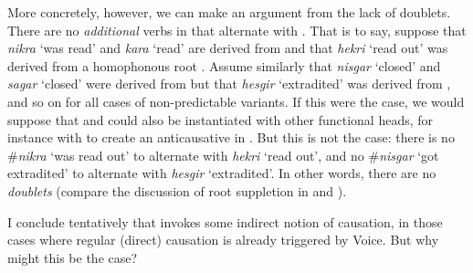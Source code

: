 \begin{exe}
\begin{xlist}
\begin{xlist}
\begin{exe}
\begin{exe}
\begin{xlist}
\begin{exe}
\begin{xlist}
\begin{exe}
\begin{xlist}
\begin{xlist}
\begin{exe}
\begin{xlist}
\begin{exe}
\begin{xlist}
\begin{exe}
\begin{exe}
\begin{exe}
\begin{xlist}
\begin{exe}
\begin{exe}
\begin{xlist}
\begin{xlist}
\begin{exe}
\begin{xlist}
\begin{exe}
\begin{exe}
\begin{exe}
\begin{xlist}
\begin{exe}
\begin{exe}
\begin{xlist}
\begin{exe}
\begin{xlist}
\begin{exe}
\begin{xlist}
\begin{exe}
\begin{xlist}
\begin{exe}
\begin{exe}
\begin{xlist}
\begin{exe}
\begin{exe}
\begin{xlist}
\begin{xlist}
\begin{exe}
\begin{xlist}
\begin{xlist}
\begin{exe}
\begin{xlist}
\begin{exe}
\begin{xlist}
More concretely, however, we can make an argument from the lack of doublets. There are no \emph{additional} verbs in {\tnif} that alternate with {\thif}. That is to say, suppose that \emph{nikra} `was read' and \emph{kara} `read' are derived from  and that \emph{hekri} `read out' was derived from a homophonous root . Assume similarly that \emph{nisgar} `closed' and \emph{sagar} `closed' were derived from  but that \emph{hesgir} `extradited' was derived from , and so on for all cases of non-predictable  variants. If this were the case, we would suppose that  and  could also be instantiated with other functional heads, for instance with {\vz} to create an anticausative in {\tnif}. But this is not the case: there is no \#\emph{nikra} `was read out' to alternate with \emph{hekri} `read out', and no \#\emph{nisgar} `got extradited' to alternate with \emph{hesgir} `extradited'. In other words, there are no \emph{doublets} (compare the discussion of root suppletion in \citealt{harley14thlia,harley14thlib,harley15roots} and \citealt{borer14thli}).

I conclude tentatively that {\vd} invokes some indirect notion of causation, in those cases where regular (direct) causation is already triggered by Voice. But why might this be the case?



\end{xlist}
\end{exe}
\end{xlist}
\end{exe}
\end{xlist}
\end{xlist}
\end{exe}
\end{xlist}
\end{xlist}
\end{exe}
\end{exe}
\end{xlist}
\end{exe}
\end{exe}
\end{xlist}
\end{exe}
\end{xlist}
\end{exe}
\end{xlist}
\end{exe}
\end{xlist}
\end{exe}
\end{exe}
\end{xlist}
\end{exe}
\end{exe}
\end{exe}
\end{xlist}
\end{exe}
\end{xlist}
\end{xlist}
\end{exe}
\end{exe}
\end{xlist}
\end{exe}
\end{exe}
\end{exe}
\end{xlist}
\end{exe}
\end{xlist}
\end{exe}
\end{xlist}
\end{xlist}
\end{exe}
\end{xlist}
\end{exe}
\end{xlist}
\end{exe}
\end{exe}
\end{xlist}
\end{xlist}
\end{exe}
